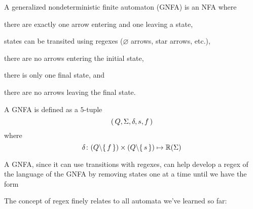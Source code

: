 A generalized nondeterministic finite automaton (GNFA) is an NFA where
\begin{compactitem}
\item there are exactly one arrow entering and one leaving a state,
\item states can be transited using regexes ($\varnothing$ arrows, star arrows, etc.),
\item there are no arrows entering the initial state,
\item there is only one final state, and
\item there are no arrows leaving the final state.
\end{compactitem}

\begin{definition}[GNFA]
    A GNFA is defined as a $5$-tuple
    \[
        { \left(\, Q,\Sigma,\delta,s,f \,\right) }
    \]
    where
    \[
        \delta \colon
        (Q \backslash { \left\{\,f\,\right\} }) \times (Q \backslash { \left\{\,s\,\right\} })
        \mapsto
        \mathbb R(\Sigma)
    \]
\end{definition}

A GNFA, since it can use transitions with regexes, can help develop a regex of the
language of the GNFA by removing states one at a time until we have the form

The concept of regex finely relates to all automata we've learned so far:

